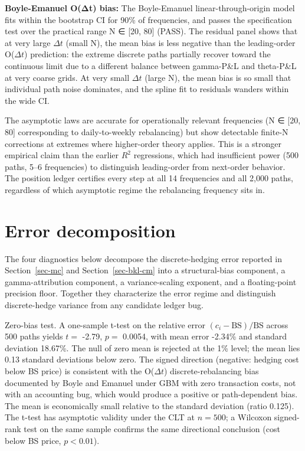 \documentclass[
  11pt,
  letterpaper,
  DIV=12,
  numbers=noendperiod]{scrartcl}
\numberwithin{equation}{section}
\numberwithin{figure}{section}
\numberwithin{table}{section}
\let\quantproofsoldsection\section
\renewcommand{\section}{\clearpage\quantproofsoldsection}
\begin{document}
\textbf{Boyle-Emanuel O(Δt) bias:} The Boyle-Emanuel
linear-through-origin model fits within the bootstrap CI for 90\% of
frequencies, and passes the specification test over the practical range
N ∈ {[}20, 80{]} (PASS). The residual panel shows that at very large
\(\Delta t\) (small N), the mean bias is less negative than the
leading-order O(\(\Delta t\)) prediction: the extreme discrete paths
partially recover toward the continuous limit due to a different balance
between gamma-P\&L and theta-P\&L at very coarse grids. At very small
\(\Delta t\) (large N), the mean bias is so small that individual path
noise dominates, and the spline fit to residuals wanders within the wide
CI.

The asymptotic laws are accurate for operationally relevant frequencies
(N ∈ {[}20, 80{]} corresponding to daily-to-weekly rebalancing) but show
detectable finite-N corrections at extremes where higher-order theory
applies. This is a stronger empirical claim than the earlier \(R^2\)
regressions, which had insufficient power (500 paths, 5--6 frequencies)
to distinguish leading-order from next-order behavior. The position
ledger certifies every step at all 14 frequencies and all 2,000 paths,
regardless of which asymptotic regime the rebalancing frequency sits in.

\section{Error decomposition}\label{sec-appendix-error-decomp}

The four diagnostics below decompose the discrete-hedging error reported
in Section~\ref{sec-mc} and Section~\ref{sec-bkl-cm} into a
structural-bias component, a gamma-attribution component, a
variance-scaling exponent, and a floating-point precision floor.
Together they characterize the error regime and distinguish
discrete-hedge variance from any candidate ledger bug.

Zero-bias test. A one-sample t-test on the relative error
\((c_i - \text{BS}) / \text{BS}\) across 500 paths yields \(t =\) -2.79,
\(p =\) 0.0054, with mean error -2.34\% and standard deviation 18.67\%.
The null of zero mean is rejected at the 1\% level; the mean lies 0.13
standard deviations below zero. The signed direction (negative: hedging
cost below BS price) is consistent with the O(\(\Delta t\))
discrete-rebalancing bias documented by Boyle and Emanuel
 under GBM with zero transaction costs,
not with an accounting bug, which would produce a positive or
path-dependent bias. The mean is economically small relative to the
standard deviation (ratio 0.125). The t-test has asymptotic validity
under the CLT at \(n = 500\); a Wilcoxon signed-rank test on the same
sample confirms the same directional conclusion (cost below BS price,
\(p < 0.01\)).
\end{document}
